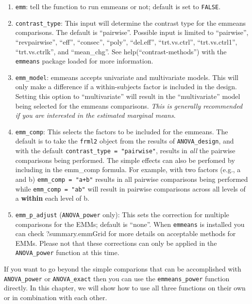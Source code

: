 \documentclass[
]{book}
\providecommand{\tightlist}{%
  \setlength{\itemsep}{0pt}\setlength{\parskip}{0pt}}
\begin{document}
\begin{enumerate}
\def\labelenumi{\arabic{enumi}.}
\tightlist
\item
  \texttt{emm}: tell the function to run emmeans or not; default is set to \texttt{FALSE}.
\item
  \texttt{contrast\_type}: This input will determine the contrast type for the emmeans comparisons. The default is ``pairwise''. Possible input is limited to ``pairwise'', ``revpairwise'', ``eff'', ``consec'', ``poly'', ``del.eff'', ``trt.vs.ctrl'', ``trt.vs.ctrl1'', ``trt.vs.ctrlk'', and ``mean\_chg''. See help(``contrast-methods'') with the \texttt{emmeans} package loaded for more information.
\item
  \texttt{emm\_model}: emmeans accepts univariate and multivariate models. This will only make a difference if a within-subjects factor is included in the design. Setting this option to ``multivariate'' will result in the ``multivariate'' model being selected for the emmeans comparisons. \emph{This is generally recommended if you are interested in the estimated marginal means}.
\item
  \texttt{emm\_comp}: This selects the factors to be included for the emmeans. The default is to take the \texttt{frml2} object from the results of \texttt{ANOVA\_design}, and with the default \texttt{contrast\_type\ =\ "pairwise"}, results in \emph{all} the pairwise comparisons being performed. The simple effects can also be perfomed by including \textbar{} in the emm\_comp formula. For example, with two factors (e.g., a and b) \texttt{emm\_comp\ =\ "a+b"} results in all pairwise comparisons being performed while \texttt{emm\_comp\ =\ "a\textbar{}b"} will result in pairwise comparisons across all levels of a \textbf{within} each level of b.
\item
  \texttt{emm\_p\_adjust} (\texttt{ANOVA\_power} only): This sets the correction for multiple comparisons for the EMMs; default is ``none''. When \texttt{emmeans} is installed you can check ?summary.emmGrid for more details on acceptable methods for EMMs. Please not that these corrections can only be applied in the \texttt{ANOVA\_power} function at this time.
\end{enumerate}

If you want to go beyond the simple comparions that can be accomplished with \texttt{ANOVA\_power} or \texttt{ANOVA\_exact} then you can use the \texttt{emmeans\_power} function directly. In this chapter, we will show how to use all three functions on their own or in combination with each other.
\end{document}
